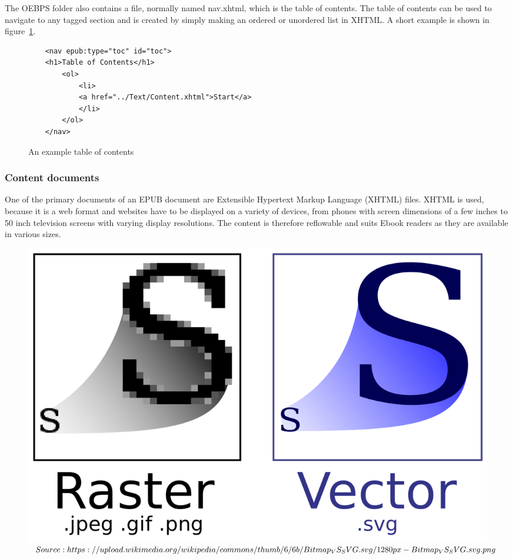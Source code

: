 The OEBPS folder also contains a file, normally named nav.xhtml, which is the table of contents. The table of contents can be used to navigate to any tagged section and is created by simply making an ordered or unordered list in XHTML. A short example is shown in figure~\ref{fig:tableOfContents}. 

\begin{figure}
	\begin{lstlisting}
	<nav epub:type="toc" id="toc">
	<h1>Table of Contents</h1>
		<ol>
			<li>
			<a href="../Text/Content.xhtml">Start</a>
			</li>
		</ol>
	</nav>		
	\end{lstlisting}
	\caption{An example table of contents}
	\label{fig:tableOfContents}
\end{figure}

\subsubsection{Content documents}

One of the primary documents of an EPUB document are Extensible Hypertext Markup Language (XHTML) files. XHTML is used, because it is a web format and websites have to be displayed on a variety of devices, from phones with screen dimensions of a few inches to 50 inch television screens with varying display resolutions. The content is therefore reflowable and suits Ebook readers as they are available in various sizes. 

\begin{figure}[h]
	\begin{center}
		\includegraphics[width=\linewidth/2]{figures/bitmapVsSvg.png}
	\end{center}
	
	\caption{$Source: https://upload.wikimedia.org/wikipedia/commons/thumb/\\6/6b/Bitmap_VS_SVG.svg/1280px-Bitmap_VS_SVG.svg.png$}
	\label{fig:bitmapSvg}
\end{figure}

